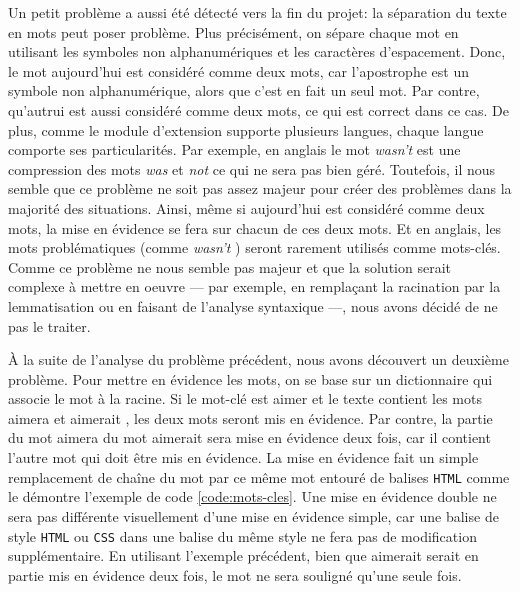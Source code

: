 Un petit probl\`eme a aussi \'et\'e d\'etect\'e vers la fin du projet: la s\'eparation du texte en mots peut poser probl\`eme.
Plus pr\'ecis\'ement, on s\'epare chaque mot en utilisant les symboles non alphanum\'eriques et les caract\`eres d'espacement.
Donc, le mot \og aujourd'hui \fg{} est consid\'er\'e comme deux mots, car l'apostrophe est un symbole non alphanum\'erique, alors que c'est en fait un seul mot.
Par contre, \og qu'autrui \fg{} est aussi consid\'er\'e comme deux mots, ce qui est correct dans ce cas.
De plus, comme le module d'extension supporte plusieurs langues, chaque langue comporte ses particularit\'es.
Par exemple, en anglais le mot \og \textit{wasn't} \fg{} est une compression des mots \og \textit{was} \fg{} et \og \textit{not} \fg{} ce qui ne sera pas bien g\'er\'e.
Toutefois, il nous semble que ce probl\`eme ne soit pas assez majeur pour cr\'eer des probl\`emes dans la majorit\'e des situations.
Ainsi, m\^eme si \og aujourd'hui \fg{} est consid\'er\'e comme deux mots, la mise en \'evidence se fera sur chacun de ces deux mots.
Et en anglais, les mots probl\'ematiques (comme \og \textit{wasn't} \fg{}) seront rarement utilis\'es comme mots-cl\'es.
Comme ce probl\`eme ne nous semble pas majeur et que la solution serait complexe \`a mettre en oeuvre --- par exemple, en rempla\c{c}ant la racination par la lemmatisation ou en faisant de l'analyse syntaxique ---, nous avons d\'ecidé de ne pas le traiter.

\`A la suite de l'analyse du probl\`eme pr\'ec\'edent, nous avons d\'ecouvert un deuxi\`eme probl\`eme.
Pour mettre en \'evidence les mots, on se base sur un dictionnaire qui associe le mot \`a la racine.
Si le mot-cl\'e est \og aimer \fg{} et le texte contient les mots \og aimera \fg{} et \og aimerait \fg{}, les deux mots seront mis en \'evidence.
Par contre, la partie du mot \og aimera \fg{} du mot \og aimerait \fg{} sera mise en \'evidence deux fois, car il contient l'autre mot qui doit \^etre mis en \'evidence.
La mise en \'evidence fait un simple remplacement de cha\^ine du mot par ce m\^eme mot entour\'e de balises \texttt{HTML} comme le d\'emontre l'exemple de code \ref{code:mots-cles}.
Une mise en \'evidence double ne sera pas diff\'erente visuellement d'une mise en \'evidence simple, car une balise de style \texttt{HTML} ou \texttt{CSS} dans une balise du m\^eme style ne fera pas de modification suppl\'ementaire.
En utilisant l'exemple pr\'ec\'edent, bien que \og aimerait \fg{} serait en partie mis en \'evidence deux fois, le mot ne sera soulign\'e qu'une seule fois.

